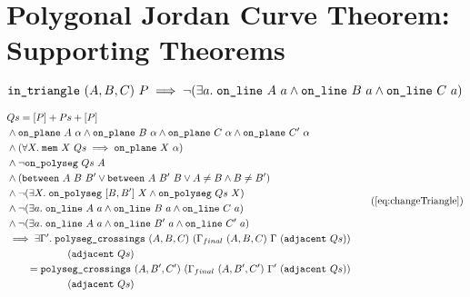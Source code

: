 \chapter{Polygonal Jordan Curve Theorem: Supporting Theorems}\label{app:JordanVerificationExtra}

\begin{equation}\label{eq:inTriangleNcol}
\texttt{in\_triangle}\ (A,B,C)\ P \implies \neg(\exists a.\; \texttt{on\_line}\ A\ a\wedge \texttt{on\_line}\ B\ a\wedge \texttt{on\_line}\ C\ a)
\end{equation}

\begin{equation}
\begin{aligned}
    &Qs = \append{[P]}{\append{Ps}{[P]}}\\
    &\wedge \code{on\_plane}\ A\ \alpha \wedge \code{on\_plane}\ B\ \alpha \wedge \code{on\_plane}\ C\ \alpha \wedge \code{on\_plane}\ C'\ \alpha\\
    &\wedge(\forall X.\; \code{mem}\ X\ Qs \implies \code{on\_plane}\ X\ \alpha)\\
    &\wedge\neg\code{on\_polyseg}\ Qs\ A\\
    &\wedge (\between{A}{B}{B'} \vee \between{A}{B'}{B} \vee A\neq B \wedge B\neq B')\\
    &\wedge \neg(\exists X.\; \code{on\_polyseg}\ [B,B']\ X \wedge \code{on\_polyseg}\ Qs\ X)\\
    &\wedge\Triangle{a}{A}{B}{C}\\
    &\wedge \Triangle{a}{A}{B'}{C'}\\
    &\implies \exists \Gamma'.\; \code{polyseg\_crossings}\ (A,B,C)\ (\Gamma_{final}\ (A,B,C)\ \Gamma\ (\code{adjacent}\ Qs))\\
    &\qquad\qquad\qquad(\code{adjacent}\ Qs)\\
    &\qquad = \code{polyseg\_crossings}\ (A,B',C')\ (\Gamma_{final}\ (A,B',C')\ \Gamma'\ (\code{adjacent}\ Qs))\\
    &\qquad\qquad\qquad(\code{adjacent}\ Qs)\\
\end{aligned}\tag{\ref{eq:changeTriangle}}
\end{equation}

